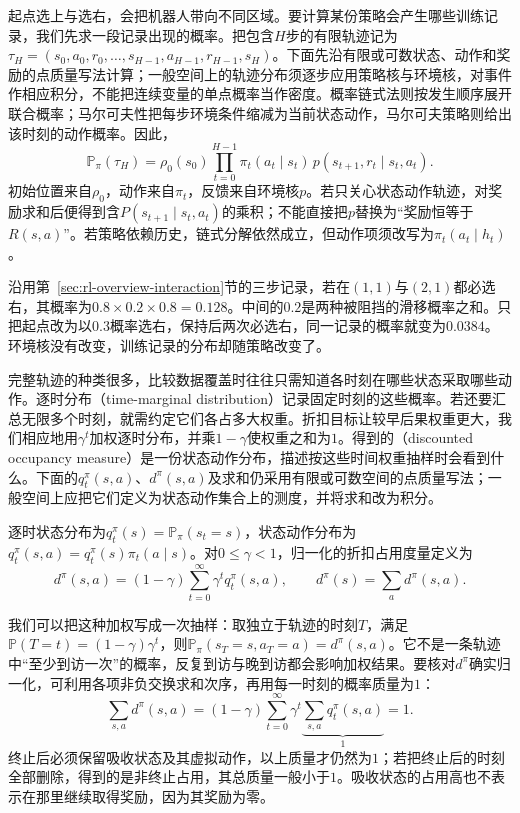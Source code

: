 起点选上与选右，会把机器人带向不同区域。要计算某份策略会产生哪些训练记录，我们先求一段记录出现的概率。把包含$H$步的有限轨迹记为$\tau_H=(s_0,a_0,r_0,\ldots,s_{H-1},a_{H-1},r_{H-1},s_H)$。下面先沿有限或可数状态、动作和奖励的点质量写法计算；一般空间上的轨迹分布须逐步应用策略核与环境核，对事件作相应积分，不能把连续变量的单点概率当作密度。概率链式法则按发生顺序展开联合概率；马尔可夫性把每步环境条件缩减为当前状态动作，马尔可夫策略则给出该时刻的动作概率。因此，
\begin{equation}
  \mathbb P_\pi(\tau_H)
  =\rho_0(s_0)\prod_{t=0}^{H-1}
    \pi_t(a_t\mid s_t)\,p(s_{t+1},r_t\mid s_t,a_t).
  \label{eq:rl-overview-trajectory}
\end{equation}
初始位置来自$\rho_0$，动作来自$\pi_t$，反馈来自环境核$p$。若只关心状态动作轨迹，对奖励求和后便得到含$P(s_{t+1}\mid s_t,a_t)$的乘积；不能直接把$p$替换为“奖励恒等于$R(s,a)$”。若策略依赖历史，链式分解依然成立，但动作项须改写为$\pi_t(a_t\mid h_t)$。

沿用第~\ref{sec:rl-overview-interaction}节的三步记录，若在$(1,1)$与$(2,1)$都必选右，其概率为$0.8\times0.2\times0.8=0.128$。中间的$0.2$是两种被阻挡的滑移概率之和。只把起点改为以$0.3$概率选右，保持后两次必选右，同一记录的概率就变为$0.0384$。环境核没有改变，训练记录的分布却随策略改变了。

完整轨迹的种类很多，比较数据覆盖时往往只需知道各时刻在哪些状态采取哪些动作。逐时分布（time-marginal distribution）记录固定时刻的这些概率。若还要汇总无限多个时刻，就需约定它们各占多大权重。折扣目标让较早后果权重更大，我们相应地用$\gamma^t$加权逐时分布，并乘$1-\gamma$使权重之和为$1$。得到的（discounted occupancy measure）是一份状态动作分布，描述按这些时间权重抽样时会看到什么。下面的$q_t^\pi(s,a)$、$d^\pi(s,a)$及求和仍采用有限或可数空间的点质量写法；一般空间上应把它们定义为状态动作集合上的测度，并将求和改为积分。

\begin{definition}[逐时分布与折扣占用度量]
  \label{def:rl-overview-occupancy}
  逐时状态分布为$q_t^\pi(s)=\mathbb P_\pi(s_t=s)$，状态动作分布为$q_t^\pi(s,a)=q_t^\pi(s)\pi_t(a\mid s)$。对$0\leq\gamma<1$，归一化的折扣占用度量定义为
  \begin{equation}
    d^\pi(s,a)=(1-\gamma)\sum_{t=0}^{\infty}
      \gamma^t q_t^\pi(s,a),\qquad
    d^\pi(s)=\sum_a d^\pi(s,a).
    \label{eq:rl-overview-occupancy}
  \end{equation}
\end{definition}

我们可以把这种加权写成一次抽样：取独立于轨迹的时刻$T$，满足$\mathbb P(T=t)=(1-\gamma)\gamma^t$，则$\mathbb P_\pi(s_T=s,a_T=a)=d^\pi(s,a)$。它不是一条轨迹中“至少到访一次”的概率，反复到访与晚到访都会影响加权结果。要核对$d^\pi$确实归一化，可利用各项非负交换求和次序，再用每一时刻的概率质量为$1$：
\[
  \sum_{s,a}d^\pi(s,a)
  =(1-\gamma)\sum_{t=0}^{\infty}\gamma^t
    \underbrace{\sum_{s,a}q_t^\pi(s,a)}_{1}=1.
\]
终止后必须保留吸收状态及其虚拟动作，以上质量才仍然为$1$；若把终止后的时刻全部删除，得到的是非终止占用，其总质量一般小于$1$。吸收状态的占用高也不表示在那里继续取得奖励，因为其奖励为零。

